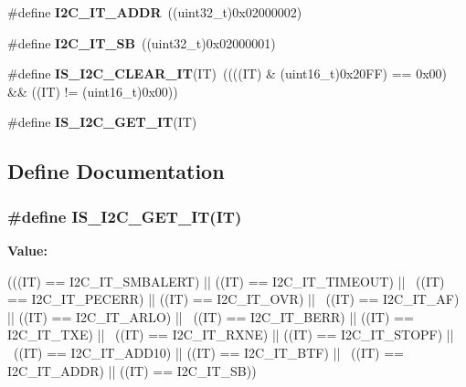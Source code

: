 \begin{DoxyCompactItemize}
\item 
\hypertarget{group__I2C__interrupts__definition_gaf68f1eda33dcb13626597f477d044025}{
\#define {\bfseries I2C\_\-IT\_\-ADDR}~((uint32\_\-t)0x02000002)}
\label{group__I2C__interrupts__definition_gaf68f1eda33dcb13626597f477d044025}

\item 
\hypertarget{group__I2C__interrupts__definition_gaec2fb9bbd0e1b128b4450b2a7b312896}{
\#define {\bfseries I2C\_\-IT\_\-SB}~((uint32\_\-t)0x02000001)}
\label{group__I2C__interrupts__definition_gaec2fb9bbd0e1b128b4450b2a7b312896}

\item 
\hypertarget{group__I2C__interrupts__definition_ga368c05fc9aadd7bb4d23280791b5a751}{
\#define {\bfseries IS\_\-I2C\_\-CLEAR\_\-IT}(IT)~((((IT) \& (uint16\_\-t)0x20FF) == 0x00) \&\& ((IT) != (uint16\_\-t)0x00))}
\label{group__I2C__interrupts__definition_ga368c05fc9aadd7bb4d23280791b5a751}

\item 
\#define {\bfseries IS\_\-I2C\_\-GET\_\-IT}(IT)
\end{DoxyCompactItemize}


\subsection{Define Documentation}
\hypertarget{group__I2C__interrupts__definition_gab3d113f3d6b6e6f7896c5d7a8d8c2d01}{
\subsubsection[{IS\_\-I2C\_\-GET\_\-IT}]{\setlength{\rightskip}{0pt plus 5cm}\#define IS\_\-I2C\_\-GET\_\-IT(IT)}}
\label{group__I2C__interrupts__definition_gab3d113f3d6b6e6f7896c5d7a8d8c2d01}
{\bfseries Value:}
\begin{DoxyCode}
(((IT) == I2C_IT_SMBALERT) || ((IT) == I2C_IT_TIMEOUT) || \
                           ((IT) == I2C_IT_PECERR) || ((IT) == I2C_IT_OVR) || \
                           ((IT) == I2C_IT_AF) || ((IT) == I2C_IT_ARLO) || \
                           ((IT) == I2C_IT_BERR) || ((IT) == I2C_IT_TXE) || \
                           ((IT) == I2C_IT_RXNE) || ((IT) == I2C_IT_STOPF) || \
                           ((IT) == I2C_IT_ADD10) || ((IT) == I2C_IT_BTF) || \
                           ((IT) == I2C_IT_ADDR) || ((IT) == I2C_IT_SB))
\end{DoxyCode}
